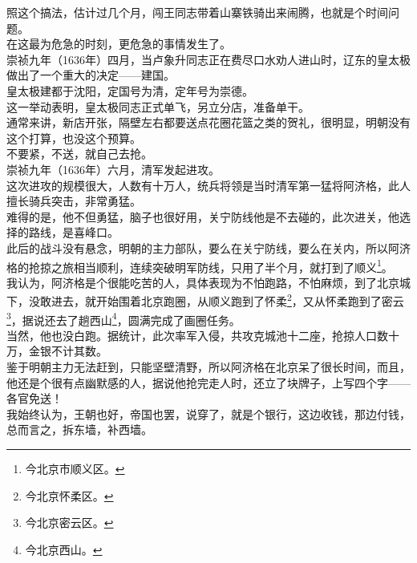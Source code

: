 \begin{multicols}{\theparacolNo}
照这个搞法，估计过几个月，闯王同志带着山寨铁骑出来闹腾，也就是个时间问题。\\

在这最为危急的时刻，更危急的事情发生了。\\

崇祯九年（1636年）四月，当卢象升同志正在费尽口水劝人进山时，辽东的皇太极做出了一个重大的决定——建国。\\

皇太极建都于沈阳，定国号为清，定年号为崇德。\\

这一举动表明，皇太极同志正式单飞，另立分店，准备单干。\\

通常来讲，新店开张，隔壁左右都要送点花圈花篮之类的贺礼，很明显，明朝没有这个打算，也没这个预算。\\

不要紧，不送，就自己去抢。\\

崇祯九年（1636年）六月，清军发起进攻。\\

这次进攻的规模很大，人数有十万人，统兵将领是当时清军第一猛将阿济格，此人擅长骑兵突击，非常勇猛。\\

难得的是，他不但勇猛，脑子也很好用，关宁防线他是不去碰的，此次进关，他选择的路线，是喜峰口。\\

此后的战斗没有悬念，明朝的主力部队，要么在关宁防线，要么在关内，所以阿济格的抢掠之旅相当顺利，连续突破明军防线，只用了半个月，就打到了顺义\footnote{今北京市顺义区。}。\\

我认为，阿济格是个很能吃苦的人，具体表现为不怕跑路，不怕麻烦，到了北京城下，没敢进去，就开始围着北京跑圈，从顺义跑到了怀柔\footnote{今北京怀柔区。}，又从怀柔跑到了密云\footnote{今北京密云区。}，据说还去了趟西山\footnote{今北京西山。}，圆满完成了画圈任务。\\

当然，他也没白跑。据统计，此次率军入侵，共攻克城池十二座，抢掠人口数十万，金银不计其数。\\

鉴于明朝主力无法赶到，只能坚壁清野，所以阿济格在北京呆了很长时间，而且，他还是个很有点幽默感的人，据说他抢完走人时，还立了块牌子，上写四个字——各官免送！\\

我始终认为，王朝也好，帝国也罢，说穿了，就是个银行，这边收钱，那边付钱，总而言之，拆东墙，补西墙。\\


\end{multicols}
